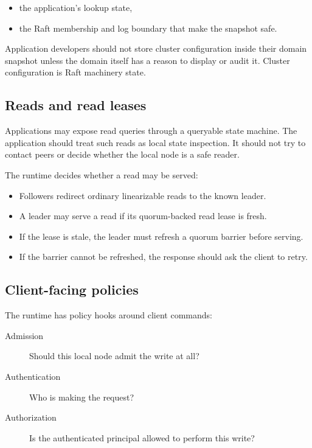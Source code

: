 \begin{itemize}
\item the application's lookup state,
\item the Raft membership and log boundary that make the snapshot safe.
\end{itemize}

Application developers should not store cluster configuration inside their
domain snapshot unless the domain itself has a reason to display or audit it.
Cluster configuration is Raft machinery state.

\subsection{Reads and read leases}

Applications may expose read queries through a queryable state machine. The
application should treat such reads as local state inspection. It should not try
to contact peers or decide whether the local node is a safe reader.

The runtime decides whether a read may be served:

\begin{itemize}
\item Followers redirect ordinary linearizable reads to the known leader.
\item A leader may serve a read if its quorum-backed read lease is fresh.
\item If the lease is stale, the leader must refresh a quorum barrier before serving.
\item If the barrier cannot be refreshed, the response should ask the client to retry.
\end{itemize}

\subsection{Client-facing policies}

The runtime has policy hooks around client commands:

\begin{description}
\item[Admission] Should this local node admit the write at all?
\item[Authentication] Who is making the request?
\item[Authorization] Is the authenticated principal allowed to perform this write?
\end{description}

